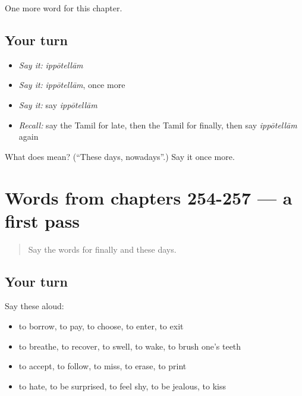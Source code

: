 \begin{grammarlens}[title={What you've built}]
One more word for this chapter.
\end{grammarlens}

\subsection*{Your turn}
\begin{itemize}
\raggedright
  \item \emph{Say it:} \emph{ippōtellām}
  \item \emph{Say it:} \emph{ippōtellām}, once more
  \item \emph{Say it:} say \emph{ippōtellām}
  \item \emph{Recall:} say the Tamil for late, then the Tamil for finally, then say \emph{ippōtellām} again
\end{itemize}

\begin{tcolorbox}[breakable,colback=teal!4,colframe=teal!35!black,title={Before you move on}]
What does  mean? (\textquotedblleft{}These days, nowadays\textquotedblright{}.) Say it once more.
\end{tcolorbox}
\section[(dialogue)]{Words from chapters 254-257 — a first pass}

\label{lesson:TA-R262-first-pass-words-from-chapters-254-257}



\begin{quote}
Say the words for finally and these days.
\end{quote}

\subsection*{Your turn}
Say these aloud:

\begin{itemize}
\raggedright
  \item to borrow, to pay, to choose, to enter, to exit
  \item to breathe, to recover, to swell, to wake, to brush one's teeth
  \item to accept, to follow, to miss, to erase, to print
  \item to hate, to be surprised, to feel shy, to be jealous, to kiss
\end{itemize}

